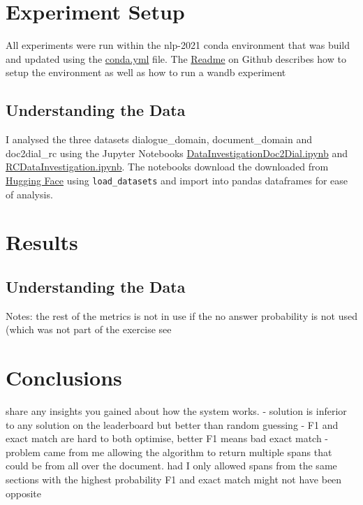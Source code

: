 \documentclass[11pt]{article}
\begin{document}
%
%
    \section{Experiment Setup}\label{sec:experiment-setup}

    All experiments were run within the nlp-2021 conda environment that was build and updated using the
    \href{https://github.com/isabelladegen/nlp-2021/blob/main/conda.yml}{conda.yml} file. The
    \href{https://github.com/isabelladegen/nlp-2021}{Readme} on Github describes how to setup the environment as well
    as how to run a wandb experiment

    \subsection{Understanding the Data}\label{subsec:understanding-the-data-experiment}
    I analysed the three datasets dialogue\_domain, document\_domain and doc2dial\_rc using the Jupyter Notebooks
    \href{https://github.com/isabelladegen/nlp-2021/blob/main/notebooks/DataInvestigationDoc2Dial.ipynb}{DataInvestigationDoc2Dial.ipynb}
    and \href{https://github.com/isabelladegen/nlp-2021/blob/main/notebooks/RCDataInvestigation.ipynb}{RCDataInvestigation.ipynb}.
    The notebooks download the downloaded from \href{https://huggingface.co/datasets/doc2dial}{Hugging Face}
    using \texttt{load\_datasets} and import into pandas dataframes \cite{reback2020pandas} for ease of analysis.


    \section{Results}\label{sec:results}

    \subsection{Understanding the Data}\label{subsec:understanding-the-data-results}

    Notes: the rest of the metrics is not in use if the no answer probability is not used (which was not part of the exercise
    see \cite{squad2git}


    \section{Conclusions}\label{sec:conclusions}
    share any insights you gained about how the system works.
    - solution is inferior to any solution on the leaderboard but better than random guessing
    - F1 and exact match are hard to both optimise, better F1 means bad exact match
    -   problem came from me allowing the algorithm to return multiple spans that could be from all over the document.
    had I only allowed spans from the same sections with the highest probability F1 and exact match might not have been opposite
\end{document}
